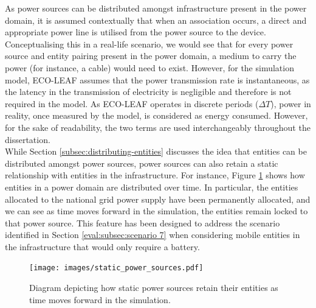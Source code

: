 \documentclass{l4proj}
\begin{document}
As power sources can be distributed amongst infrastructure present in the power domain, it is assumed contextually that when an association occurs, a direct and appropriate power line is utilised from the power source to the device.
Conceptualising this in a real-life scenario, we would see that for every power source and entity pairing present in the power domain, a medium to carry the power (for instance, a cable) would need to exist.
However, for the simulation model, ECO-LEAF assumes that the power transmission rate is instantaneous, as the latency in the transmission of electricity is negligible \citep{speed-of-electricity} and therefore is not required in the model.
As ECO-LEAF operates in discrete periods ($\varDelta T$), power in reality, once measured by the model, is considered as energy consumed.
However, for the sake of readability, the two terms are used interchangeably throughout the dissertation.\\

While Section \ref{subsec:distributing-entities} discusses the idea that entities can be distributed amongst power sources, power sources can also retain a static relationship with entities in the infrastructure.
For instance, Figure \ref{fig:staticPower} shows how entities in a power domain are distributed over time.
In particular, the entities allocated to the national grid power supply have been permanently allocated, and we can see as time moves forward in the simulation, the entities remain locked to that power source.
This feature has been designed to address the scenario identified in Section \ref{eval:subsec:scenario 7} when considering mobile entities in the infrastructure that would only require a battery.

\begin{figure}[h]
    \centering
    \texttt{[image: images/static\_power\_sources.pdf]}
    ~
    \caption{Diagram depicting how static power sources retain their entities as time moves forward in the simulation.}
    \label{fig:staticPower}
\end{figure}
\end{document}
